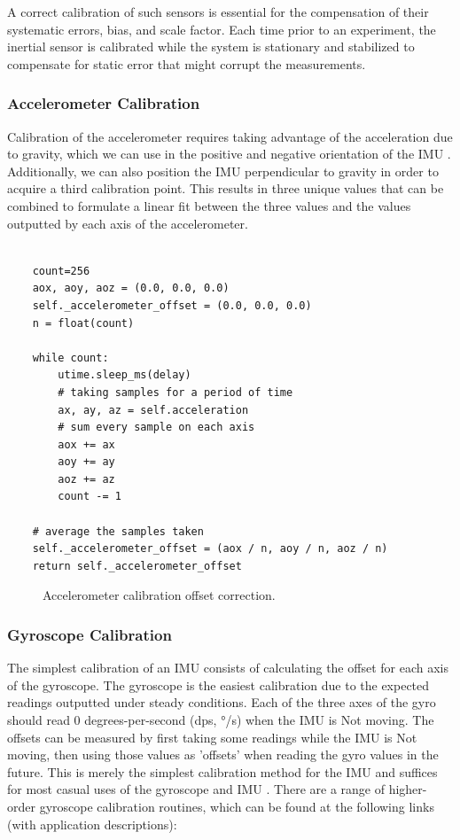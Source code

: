 A correct calibration of such sensors is essential for the compensation of their systematic errors, bias, and scale factor. Each time prior to an experiment, the inertial sensor is calibrated while the system is stationary and stabilized to compensate for static error that might corrupt the measurements.

\subsubsection{Accelerometer Calibration}

Calibration of the accelerometer requires taking advantage of the acceleration due to gravity, which we can use in the positive and negative orientation of the IMU \cite{won2009triaxial}. Additionally, we can also position the IMU perpendicular to gravity in order to acquire a third calibration point. This results in three unique values that can be combined to formulate a linear fit between the three values and the values outputted by each axis of the accelerometer.

\lstset{language=Python}
\begin{lstlisting}[frame=single]  % Start your code-block

    count=256
    aox, aoy, aoz = (0.0, 0.0, 0.0)
    self._accelerometer_offset = (0.0, 0.0, 0.0)
    n = float(count)

    while count:
        utime.sleep_ms(delay)
        # taking samples for a period of time
        ax, ay, az = self.acceleration
        # sum every sample on each axis
        aox += ax
        aoy += ay
        aoz += az 
        count -= 1

    # average the samples taken
    self._accelerometer_offset = (aox / n, aoy / n, aoz / n)
    return self._accelerometer_offset
\end{lstlisting}

\begin{figure}[!h]
  \centering
  \resizebox{0.8\linewidth}{!}{}
  \caption{Accelerometer calibration offset correction.}
\end{figure}

\subsubsection{Gyroscope Calibration}

The simplest calibration of an IMU consists of calculating the offset for each axis of the gyroscope. The gyroscope is the easiest calibration due to the expected readings outputted under steady conditions. Each of the three axes of the gyro should read 0 degrees-per-second (dps, °/s) when the IMU is Not moving. The offsets can be measured by first taking some readings while the IMU is Not moving, then using those values as 'offsets' when reading the gyro values in the future. This is merely the simplest calibration method for the IMU and suffices for most casual uses of the gyroscope and IMU \cite{olivares2009high}. There are a range of  higher-order gyroscope calibration routines, which can be found at the following links (with application descriptions):

